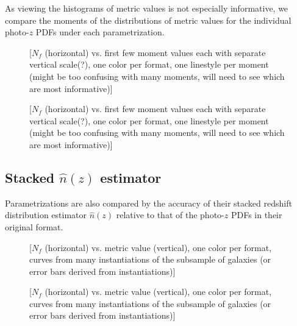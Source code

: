 \documentclass[\docopts]{\docclass}
\newcommand{\pz}{photo-$z$ PDF}
\begin{document}
As viewing the histograms of metric values is not especially informative, we 
compare the moments of the distributions of metric values for the individual 
\pz s under each parametrization.

\begin{figure}
  \caption{[$N_{f}$ (horizontal) vs. first few moment values each with separate 
vertical scale(?), one color per format, one linestyle per moment (might be too 
confusing with many moments, will need to see which are most informative)]
  \label{fig:individual-ss}}
\end{figure}

\begin{figure}
  \caption{[$N_{f}$ (horizontal) vs. first few moment values each with separate 
vertical scale(?), one color per format, one linestyle per moment (might be too 
confusing with many moments, will need to see which are most informative)]
  \label{fig:individual-mg}}
\end{figure}


\subsection{Stacked $\hat{n}(z)$ estimator}
\label{sec:stacked}

Parametrizations are also compared by the accuracy of their stacked redshift 
distribution estimator $\hat{n}(z)$ relative to that of the \pz s in their 
original format.

\begin{figure}
  \caption{[$N_{f}$ (horizontal) vs. metric value (vertical), one color per 
format, curves from many instantiations of the subsample of galaxies (or error 
bars derived from instantiations)]
  \label{fig:stacked-ss}}
\end{figure}

\begin{figure}
  \caption{[$N_{f}$ (horizontal) vs. metric value (vertical), one color per 
format, curves from many instantiations of the subsample of galaxies (or error 
bars derived from instantiations)]
  \label{fig:stacked-mg}}
\end{figure}

\end{document}
